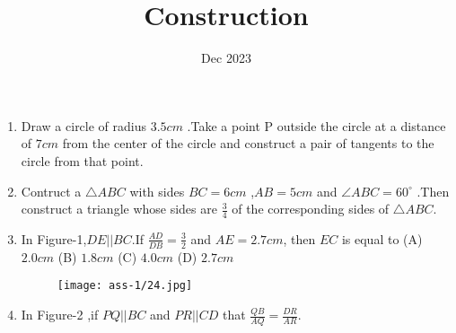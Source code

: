 \documentclass{article}
\title{Construction}
\date{Dec 2023}
\begin{document}
\maketitle
\begin{enumerate}
\item Draw a circle of radius $3.5cm$ .Take a point P outside the circle at a distance of $7cm$ from the center of the circle and construct a pair of tangents to the circle from that point.

\item Contruct a $\bigtriangleup ABC $ with sides $BC = 6cm$ ,$AB = 5cm$ and $\angle ABC = 60^{\circ}$ .Then construct a triangle whose sides are $\frac{3}{4}$ of the corresponding sides of $\bigtriangleup ABC$.

\item In Figure-1,$DE || BC $.If $\frac{AD}{DB}=\frac{3}{2}$ and $AE = 2.7cm$, then $EC$ is equal to
	(A) $2.0cm$ \newline
	(B) $1.8cm$ \newline
	(C) $4.0cm$ \newline
	(D) $2.7cm$ \newline
	
	\begin{figure}[h]
		\centering
		\texttt{[image: ass-1/24.jpg]}
		\caption{}
	\end{figure}

\item In Figure-2 ,if $PQ || BC$ and $PR || CD$ that $\frac{QB}{AQ} = \frac{DR}{AR}$.

\end{enumerate}
\end{document}

